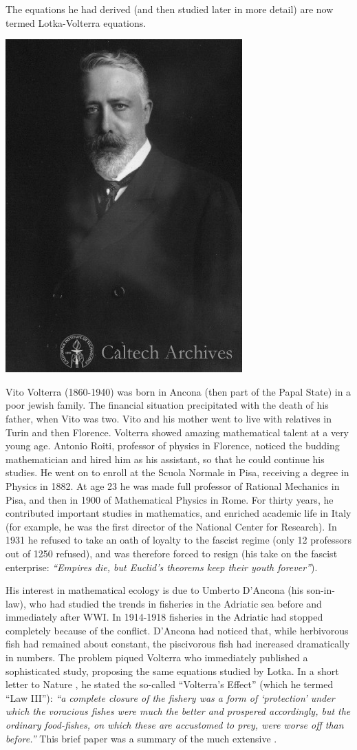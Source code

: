 \documentclass[]{book}
\begin{document}
The equations he had derived (and then studied later in more detail) are now termed Lotka-Volterra equations.

\begin{center}\includegraphics[width=0.25\linewidth]{images/Volterra} \end{center}

Vito Volterra (1860-1940) was born in Ancona (then part of the Papal State) in a poor jewish family. The financial situation precipitated with the death of his father, when Vito was two. Vito and his mother went to live with relatives in Turin and then Florence. Volterra showed amazing mathematical talent at a very young age. Antonio Roiti, professor of physics in Florence, noticed the budding mathematician and hired him as his assistant, so that he could continue his studies. He went on to enroll at the Scuola Normale in Pisa, receiving a degree in Physics in 1882. At age 23 he was made full professor of Rational Mechanics in Pisa, and then in 1900 of Mathematical Physics in Rome. For thirty years, he contributed important studies in mathematics, and enriched academic life in Italy (for example, he was the first director of the National Center for Research). In 1931 he refused to take an oath of loyalty to the fascist regime (only 12 professors out of 1250 refused), and was therefore forced to resign (his take on the fascist enterprise: \emph{``Empires die, but Euclid's theorems keep their youth forever''}).

His interest in mathematical ecology is due to Umberto D'Ancona (his son-in-law), who had studied the trends in fisheries in the Adriatic sea before and immediately after WWI. In 1914-1918 fisheries in the Adriatic had stopped completely because of the conflict. D'Ancona had noticed that, while herbivorous fish had remained about constant, the piscivorous fish had increased dramatically in numbers. The problem piqued Volterra who immediately published a sophisticated study, proposing the same equations studied by Lotka. In a short letter to Nature \citep{volterra1926fluctuations}, he stated the so-called ``Volterra's Effect'' (which he termed ``Law III''): \emph{``a complete closure of the fishery was a form of `protection' under which the voracious fishes were much the better and prospered accordingly, but the ordinary food-fishes, on which these are accustomed to prey, were worse off than before.''} This brief paper was a summary of the much extensive \citet{volterra1926variazioni}.
\end{document}
